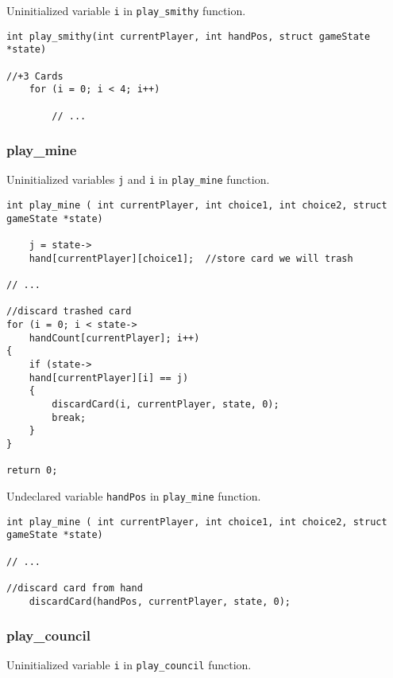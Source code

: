 \documentclass[11pt]{article}
\begin{document}
Uninitialized variable \texttt{i} in \texttt{play\_smithy} function.

\begin{verbatim}
int play_smithy(int currentPlayer, int handPos, struct gameState *state)

//+3 Cards
    for (i = 0; i < 4; i++)

        // ...
\end{verbatim}

\subsubsection{play\_mine}
\label{sec:playmine}

Uninitialized variables \texttt{j} and \texttt{i} in \texttt{play\_mine} function.

\begin{verbatim}
int play_mine ( int currentPlayer, int choice1, int choice2, struct gameState *state)

    j = state->
    hand[currentPlayer][choice1];  //store card we will trash

// ...

//discard trashed card
for (i = 0; i < state->
    handCount[currentPlayer]; i++)
{
    if (state->
    hand[currentPlayer][i] == j)
    {
        discardCard(i, currentPlayer, state, 0);
        break;
    }
}

return 0;

\end{verbatim}

Undeclared variable \texttt{handPos} in \texttt{play\_mine} function.

\begin{verbatim}
int play_mine ( int currentPlayer, int choice1, int choice2, struct gameState *state)

// ...

//discard card from hand
    discardCard(handPos, currentPlayer, state, 0);
\end{verbatim}

\subsubsection{play\_council}
\label{sec:playcouncil}

Uninitialized variable \texttt{i} in \texttt{play\_council} function.
\end{document}
